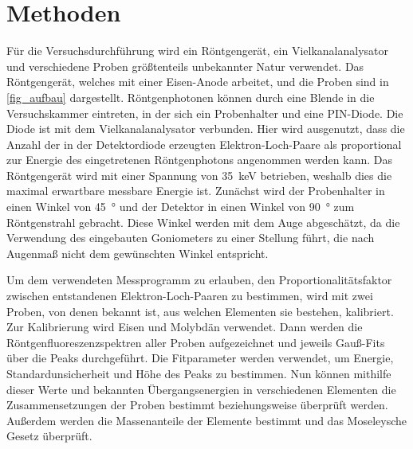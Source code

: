 \documentclass[
	a4paper,
	12pt,
	pagesize,
	ngerman
]{scrartcl}
\begin{document}
	
	
	\section{Methoden}
	Für die Versuchsdurchführung wird ein Röntgengerät, ein Vielkanalanalysator und verschiedene Proben größtenteils unbekannter Natur verwendet. %
	Das Röntgengerät, welches mit einer Eisen-Anode arbeitet, und die Proben sind in \cref{fig_aufbau} dargestellt.
	Röntgenphotonen können durch eine Blende in die Versuchskammer eintreten, in der sich ein Probenhalter und eine PIN-Diode.
	Die Diode ist mit dem Vielkanalanalysator verbunden.
	Hier wird ausgenutzt, dass die Anzahl der in der Detektordiode erzeugten Elektron-Loch-Paare als proportional zur Energie des eingetretenen Röntgenphotons angenommen werden kann.
	Das Röntgengerät wird mit einer Spannung von \SI{35}{\kilo \electronvolt} betrieben, weshalb dies die maximal erwartbare messbare Energie ist.
	Zunächst wird der Probenhalter in einen Winkel von \SI{45}{\degree} und der Detektor in einen Winkel von \SI{90}{\degree} zum Röntgenstrahl gebracht.
	Diese Winkel werden mit dem Auge abgeschätzt, da die Verwendung des eingebauten Goniometers zu einer Stellung führt, die nach Augenmaß nicht dem gewünschten Winkel entspricht.
	
	Um dem verwendeten Messprogramm zu erlauben, den Proportionalitätsfaktor zwischen entstandenen Elektron-Loch-Paaren zu bestimmen, wird mit zwei Proben, von denen bekannt ist, aus welchen Elementen sie bestehen, kalibriert.
	Zur Kalibrierung wird Eisen und Molybdän verwendet.
	Dann werden die Röntgenfluoreszenzspektren aller Proben aufgezeichnet und jeweils Gauß-Fits über die Peaks durchgeführt.
	Die Fitparameter werden verwendet, um Energie, Standardunsicherheit und Höhe des Peaks zu bestimmen.
	Nun können mithilfe dieser Werte und bekannten Übergangsenergien in verschiedenen Elementen die Zusammensetzungen der Proben bestimmt beziehungsweise überprüft werden. %
	Außerdem werden die Massenanteile der Elemente bestimmt und das Moseleysche Gesetz überprüft.
	
	
\end{document}
